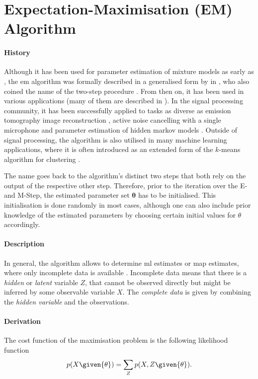 \section{Expectation-Maximisation (EM) Algorithm}
\label{sec:em}

\paragraph{History}
Although it has been used for parameter estimation of mixture models as early as \citeyear{Newcomb1886} \cite{Newcomb1886}, the \gls{em} algorithm was formally described in a generalised form by \citeauthor{Dempster1977} in \citeyear{Dempster1977}, who also coined the name of the two-step procedure \cite{Dempster1977}. From then on, it has been used in various applications (many of them are described in \cite{McLachlan2008}). In the signal processing community, it has been successfully applied to tasks as diverse as emission tomography image reconstruction \cite{Shepp1982}, active noise cancelling with a single microphone \cite{Feder1989} and parameter estimation of hidden markov models \cite{Moon1996}. Outside of signal processing, the algorithm is also utilised in many machine learning applications, where it is often introduced as an extended form of the $k$-means algorithm for clustering \cite{Bishop2006}.

The name  goes back to the algorithm's distinct two steps that both rely on the output of the respective other step. Therefore, prior to the iteration over the E- and M-Step, the estimated parameter set $\bm \theta$ has to be initialised. This initialisation is done randomly in most cases, although one can also include prior knowledge of the estimated parameters by choosing certain initial values for $\theta$ accordingly.

\paragraph{Description} In general, the algorithm allows to determine \gls{ml} estimates or \gls{map} estimates, where only incomplete data is available \cite[p.~1]{Dempster1977}. Incomplete data means that there is a \textit{hidden} or \textit{latent} variable $Z$, that cannot be observed directly but might be inferred by some observable variable $X$. The \textit{complete data} is given by combining the \textit{hidden variable} and the observations.

\paragraph{Derivation}
The cost function of the maximisation problem is the following likelihood function
\begin{equation}
    p(X\given{\theta})=\sum_Z p(X,Z\given{\theta}).
\end{equation}

